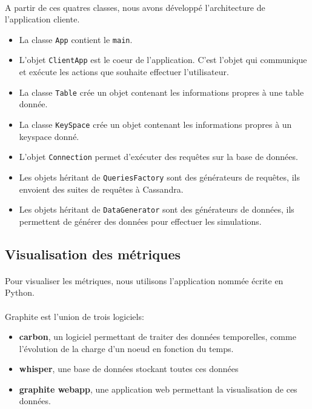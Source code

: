 \documentclass[12pt]{article}
\newcommand{\class}[1]{\texttt{#1}}
\begin{document}
\paragraph{} A partir de ces quatres classes, nous avons développé l'architecture de l'application cliente.
\begin{itemize}
 \item La classe \class{App} contient le \class{main}.
 \item L'objet \class{ClientApp} est le coeur de l'application. C'est l'objet qui communique et exécute les actions que souhaite effectuer l'utilisateur.
 \item La classe \class{Table} crée un objet contenant les informations propres à une table donnée.
 \item La classe \class{KeySpace} crée un objet contenant les informations propres à un keyspace donné.
 \item L'objet \class{Connection} permet d'exécuter des requêtes sur la base de données.
 \item Les objets héritant de \class{QueriesFactory} sont des générateurs de requêtes, ils envoient des suites de requêtes à Cassandra.
 \item Les objets héritant de \class{DataGenerator} sont des générateurs de données, ils permettent de générer des données pour effectuer les simulations.
\end{itemize}


\subsection{Visualisation des métriques}

\paragraph{} Pour visualiser les métriques, nous utilisons l'application nommée  écrite en Python.

\paragraph{} Graphite est l'union de trois logiciels:
\begin{itemize}
 \item \textbf{carbon}, un logiciel permettant de traiter des données temporelles, comme l'évolution de la charge d'un noeud en fonction du temps.
 \item \textbf{whisper}, une base de données stockant toutes ces données
 \item \textbf{graphite webapp}, une application web permettant la visualisation de ces données.
\end{itemize}
\end{document}

